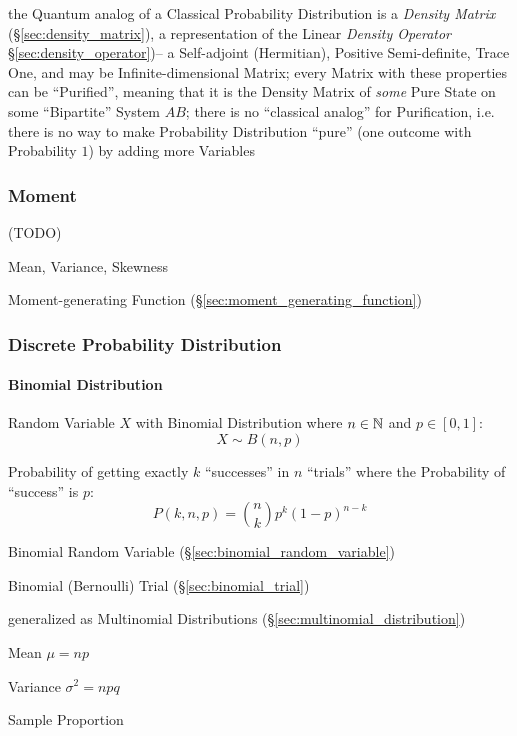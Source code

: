 the Quantum analog of a Classical Probability Distribution is a \emph{Density
  Matrix} (\S\ref{sec:density_matrix}), a representation of the Linear
\emph{Density Operator} \S\ref{sec:density_operator})-- a Self-adjoint
(Hermitian), Positive Semi-definite, Trace One, and may be Infinite-dimensional
Matrix; every Matrix with these properties can be ``Purified'', meaning that it
is the Density Matrix of \emph{some} Pure State on some ``Bipartite'' System
$AB$; there is no ``classical analog'' for Purification, i.e. there is no way to
make Probability Distribution ``pure'' (one outcome with Probability $1$) by
adding more Variables



\subsubsection{Moment}\label{sec:moment}

(TODO)

Mean, Variance, Skewness

\fist Moment-generating Function (\S\ref{sec:moment_generating_function})



\subsubsection{Discrete Probability Distribution}
\label{sec:discrete_probability}

\paragraph{Binomial Distribution}\label{sec:binomial_distribution}\hfill

Random Variable $X$ with Binomial Distribution where $n \in \mathbb{N}$ and
$p \in [0,1]$:
\[
  X \sim B(n,p)
\]

Probability of getting exactly $k$ ``successes'' in $n$ ``trials'' where the
Probability of ``success'' is $p$:
\[
  P(k,n,p) = \binom{n}{k}p^k(1-p)^{n-k}
\]

Binomial Random Variable (\S\ref{sec:binomial_random_variable})

Binomial (Bernoulli) Trial (\S\ref{sec:binomial_trial})

generalized as Multinomial Distributions (\S\ref{sec:multinomial_distribution})

Mean $\mu = n p$

Variance $\sigma^2 = n p q$

Sample Proportion %



